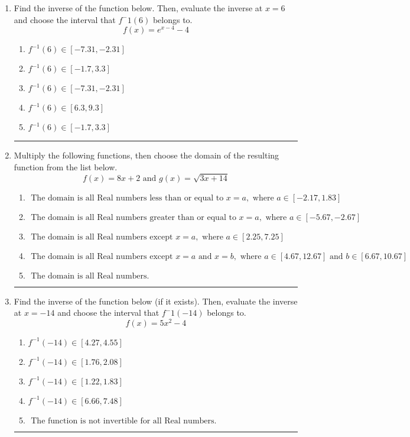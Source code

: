 \documentclass[14pt]{extbook}
\newcommand{\litem}[1]{\item#1\hspace*{-1cm}\rule{\textwidth}{0.4pt}}
\begin{document}
\begin{enumerate}
{\begin{enumerate}[label=\Alph*.]
\end{enumerate} }
\litem{
Find the inverse of the function below. Then, evaluate the inverse at $x = 6$ and choose the interval that $f^-1(6)$ belongs to.\[ f(x) = e^{x-4}-4 \]\begin{enumerate}[label=\Alph*.]
\item \( f^{-1}(6) \in [-7.31, -2.31] \)
\item \( f^{-1}(6) \in [-1.7, 3.3] \)
\item \( f^{-1}(6) \in [-7.31, -2.31] \)
\item \( f^{-1}(6) \in [6.3, 9.3] \)
\item \( f^{-1}(6) \in [-1.7, 3.3] \)

\end{enumerate} }
\litem{
Multiply the following functions, then choose the domain of the resulting function from the list below.\[ f(x) = 8x + 2 \text{ and } g(x) = \sqrt{3x+14}  \]\begin{enumerate}[label=\Alph*.]
\item \( \text{ The domain is all Real numbers less than or equal to } x = a, \text{ where } a \in [-2.17, 1.83] \)
\item \( \text{ The domain is all Real numbers greater than or equal to } x = a, \text{ where } a \in [-5.67, -2.67] \)
\item \( \text{ The domain is all Real numbers except } x = a, \text{ where } a \in [2.25, 7.25] \)
\item \( \text{ The domain is all Real numbers except } x = a \text{ and } x = b, \text{ where } a \in [4.67, 12.67] \text{ and } b \in [6.67, 10.67] \)
\item \( \text{ The domain is all Real numbers. } \)

\end{enumerate} }
\litem{
Find the inverse of the function below (if it exists). Then, evaluate the inverse at $x = -14$ and choose the interval that $f^-1(-14)$ belongs to.\[ f(x) = 5 x^2 - 4 \]\begin{enumerate}[label=\Alph*.]
\item \( f^{-1}(-14) \in [4.27, 4.55] \)
\item \( f^{-1}(-14) \in [1.76, 2.08] \)
\item \( f^{-1}(-14) \in [1.22, 1.83] \)
\item \( f^{-1}(-14) \in [6.66, 7.48] \)
\item \( \text{ The function is not invertible for all Real numbers. } \)


\end{enumerate}}
\end{enumerate}
\end{document}

